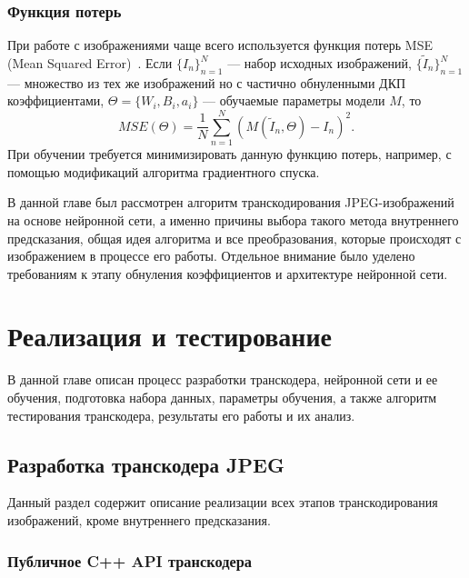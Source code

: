 \documentclass[times,specification,annotation]{itmo-student-thesis}
\begin{document}
\subsection{Функция потерь}\label{subsection:loss-function}

При работе с изображениями чаще всего используется функция потерь MSE (Mean Squared Error)~\cite{ar-cnn-overview,qe-cnn-overview}. Если $\{I_n\}_{n=1}^N$ --- набор исходных изображений, $\{\tilde{I}_n\}_{n=1}^N$ --- множество из тех же изображений но с частично обнуленными ДКП коэффициентами, $\Theta=\{W_i, B_i, a_i\}$ --- обучаемые параметры модели $M$, то
\[
    MSE(\Theta) = \dfrac{1}{N} \sum_{n=1}^N \left( M(\tilde{I}_n, \Theta) - I_n \right)^2.
\]
При обучении требуется минимизировать данную функцию потерь, например, с помощью модификаций алгоритма градиентного спуска.

\chapterconclusion

В данной главе был рассмотрен алгоритм транскодирования JPEG-изображений на основе нейронной сети, а именно причины выбора такого метода внутреннего предсказания, общая идея алгоритма и все преобразования, которые происходят с изображением в процессе его работы. Отдельное внимание было уделено требованиям к этапу обнуления коэффициентов и архитектуре нейронной сети.

\chapter{Реализация и тестирование}\label{chapter:implementation-and-testing}

В данной главе описан процесс разработки транскодера, нейронной сети и ее обучения, подготовка набора данных, параметры обучения, а также алгоритм тестирования транскодера, результаты его работы и их анализ.

\section{Разработка транскодера JPEG}\label{section:transcoding-implementation}

Данный раздел содержит описание реализации всех этапов транскодирования изображений, кроме внутреннего предсказания.

\subsection{Публичное C++ API транскодера}\label{subsection:decoder-cpp-api}
\end{document}
